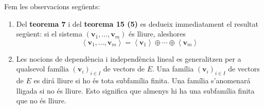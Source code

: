 \begin{observacio}
Fem les observacions següents:

\begin{enumerate}
\item Del \textbf{teorema 7} i del \textbf{teorema 15 (5)} es dedueix
immediatament el resultat següent: si el sistema $\left( \mathbf{v}%
_{1},...,\mathbf{v}_{m}\right) $ és lliure, aleshores%
\begin{equation*}
\left\langle \mathbf{v}_{1},...,\mathbf{v}_{m}\right\rangle =\left\langle 
\mathbf{v}_{1}\right\rangle \oplus \cdots \oplus \left\langle \mathbf{v}%
_{m}\right\rangle
\end{equation*}

\item Les nocions de dependència i independència lineal es generalitzen per a
qualsevol família $(\mathbf{v}_{i})_{i\in I}$ de vectors de $E$.
Una família $(\mathbf{v}_{i})_{i\in I}$ de vectors de $E$ es dirá lliure si ho és tota subfamília finita. Una família s’anomenará
lligada si no és lliure. Esto significa que almenys hi ha una subfamília finita
que no és lliure.
\end{enumerate}
\end{observacio}

